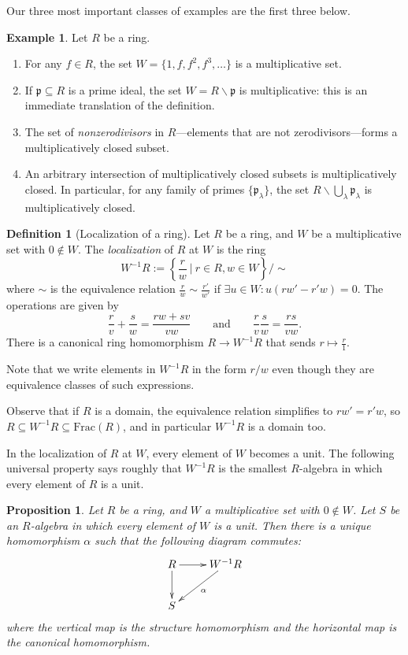 \documentclass{amsart}[12pt]
\newcommand{\p}{{\mathfrak p}}
\numberwithin{equation}{section}
\theoremstyle{plain} %
\newtheorem{proposition}[equation]{Proposition}
\theoremstyle{definition}
\newtheorem{definition}[equation]{Definition}
\newtheorem{example}[equation]{Example}
\theoremstyle{remark}
\begin{document}
Our three most important classes of  examples are the first three below.
\begin{example} Let $R$ be a ring.
	\begin{enumerate}
		\item For any $f\in R$, the set $W=\{1, f, f^2, f^3, \dots\}$ is a multiplicative set.
		\item If $\p\subseteq R$ is a prime ideal, the set $W=R\smallsetminus \p$ is multiplicative: this is an immediate translation of the definition.
		\item The set of \emph{nonzerodivisors} in $R$---elements that are not zerodivisors---forms a multiplicatively closed subset.
		\item An arbitrary intersection of multiplicatively closed subsets is multiplicatively closed. In particular, for any family of primes $\{\p _{\lambda} \}$, the set $R \smallsetminus \bigcup_{\lambda} \p _{\lambda}$ is multiplicatively closed.
	\end{enumerate}
\end{example}

\begin{definition}[Localization of a ring]
	Let $R$ be a ring, and $W$ be a multiplicative set with $0\notin W$. The \emph{localization} of $R$ at $W$ is the ring 
	\[ W^{-1} R := \left\{ \frac{r} {w} \ \Big| \ r\in R, w\in W \right\} / \sim \]
	where $\sim$ is the equivalence relation $\displaystyle \frac{r}{w}\sim \frac{r'}{w'}$ if $\exists u\in W : u(rw'-r'w)=0$. The operations are given by 
	\[ \frac{r}{v}+\frac{s}{w}=\frac{rw+sv}{vw} \qquad \text{and} \qquad  \frac{r}{v}\frac{s}{w}=\frac{rs}{vw}.\]
	There is a canonical ring homomorphism $R\to W^{-1}R$ that sends $r \mapsto \frac{r}{1}$.
\end{definition}

Note that we write elements in $W^{-1}R$ in the form $r/w$ even though they are equivalence classes of such expressions.

Observe that if $R$ is a domain, the equivalence relation simplifies to $rw'=r'w$, so $R \subseteq W^{-1}R \subseteq \mathrm{Frac}(R)$, and in particular $ W^{-1}R$ is a domain too.

In the localization of $R$ at $W$, every element of $W$ becomes a unit. The following universal property says roughly that $W^{-1}R$ is the smallest $R$-algebra in which every element of $R$ is a unit.

\begin{proposition}
	Let $R$ be a ring, and $W$ a multiplicative set with $0\notin W$. Let $S$ be an $R$-algebra in which every element of $W$ is a unit. Then there is a unique homomorphism $\alpha$ such that the following diagram commutes:
	\[\xymatrix{ R \ar[r]\ar[d] & W^{-1}R \ar[dl]^{\alpha} \\  S& } \]
	where the vertical map is the structure homomorphism and the horizontal map is the canonical homomorphism.
\end{proposition}
\end{document}
